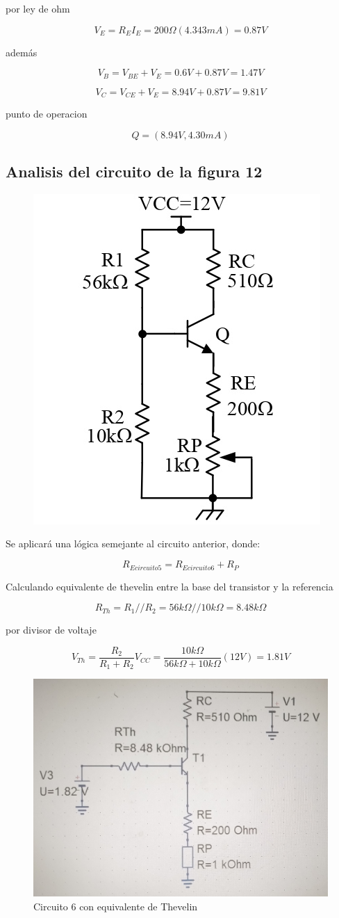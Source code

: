 \documentclass[10pt, a4paper]{article}
\begin{document}
    por ley de ohm

    $$V_E = R_EI_E = 200\Omega (4.343mA) = 0.87V$$

    además

    $$V_B = V_{BE} + V_E = 0.6V + 0.87V = 1.47V$$

    $$V_C = V_{CE} + V_E = 8.94V + 0.87V = 9.81V$$

    punto de operacion

    $$Q = (8.94V, 4.30mA)$$

    \subsection{Analisis del circuito de la figura 12}

    \begin{figure}[h!]
        \centering
        \includegraphics[height=5cm\textwidth]{circuito6.jpg}
    \end{figure}

    Se aplicará una lógica semejante al circuito anterior, donde:

    $$R_{Ecircuito5} = R_{Ecircuito6} + R_P$$

    Calculando equivalente de thevelin entre la base del transistor y la referencia

    $$R_{Th} = R_1 // R_2 = 56k\Omega // 10k\Omega = 8.48k\Omega$$
    
    por divisor de voltaje

    $$V_{Th} = \frac{R_2}{R_1 + R_2} V_{CC} = \frac{10k\Omega}{56k\Omega + 10k\Omega} (12V) = 1.81V$$

    \begin{figure}[h!]
        \centering
        \includegraphics[height=5cm\textwidth]{thevelin6.jpg} \par
        \caption{\label{fig:14} Circuito 6 con equivalente de Thevelin}
    \end{figure}
\end{document}
